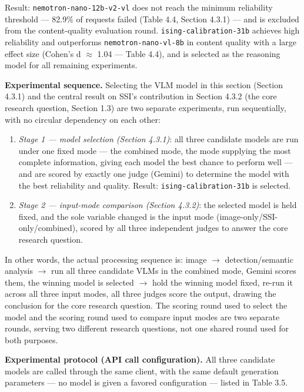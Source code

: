 \documentclass[12pt,a4paper]{report}
\begin{document}
Result: \texttt{nemotron-nano-12b-v2-vl} does not reach the minimum reliability threshold --- 82.9\% of requests failed (Table 4.4, Section 4.3.1) --- and is excluded from the content-quality evaluation round. \texttt{ising-calibration-31b} achieves high reliability and outperforms \texttt{nemotron-nano-vl-8b} in content quality with a large effect size (Cohen's d $\approx$ 1.04 --- Table 4.4), and is selected as the reasoning model for all remaining experiments.

\textbf{Experimental sequence.} Selecting the VLM model in this section (Section 4.3.1) and the central result on SSI's contribution in Section 4.3.2 (the core research question, Section 1.3) are two separate experiments, run sequentially, with no circular dependency on each other:

\begin{enumerate}
    \item \textit{Stage 1 --- model selection (Section 4.3.1)}: all three candidate models are run under one fixed mode --- the combined mode, the mode supplying the most complete information, giving each model the best chance to perform well --- and are scored by exactly one judge (Gemini) to determine the model with the best reliability and quality. Result: \texttt{ising-calibration-31b} is selected.
    \item \textit{Stage 2 --- input-mode comparison (Section 4.3.2)}: the selected model is held fixed, and the sole variable changed is the input mode (image-only/SSI-only/combined), scored by all three independent judges to answer the core research question.
\end{enumerate}

In other words, the actual processing sequence is: image $\to$ detection/semantic analysis $\to$ run all three candidate VLMs in the combined mode, Gemini scores them, the winning model is selected $\to$ hold the winning model fixed, re-run it across all three input modes, all three judges score the output, drawing the conclusion for the core research question. The scoring round used to select the model and the scoring round used to compare input modes are two separate rounds, serving two different research questions, not one shared round used for both purposes.

\textbf{Experimental protocol (API call configuration).} All three candidate models are called through the same client, with the same default generation parameters --- no model is given a favored configuration --- listed in Table 3.5.
\end{document}
